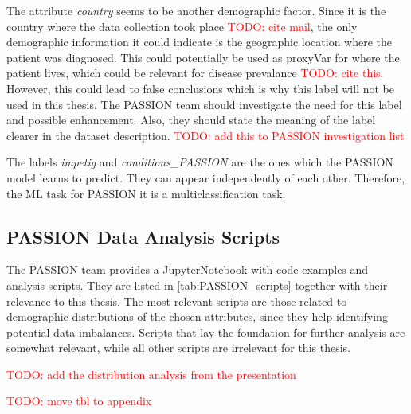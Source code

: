 \documentclass[12pt, a4paper, oneside]{book}   	%
\renewcommand{\todo}[1]{\textcolor{red}{TODO: #1}}
\begin{document}
				The attribute \textit{country} seems to be another demographic factor. Since it is the country where the data collection took place \todo{cite mail}, the only demographic information it could indicate is the geographic location where the patient was diagnosed. This could potentially be used as \gls{proxyVar} for where the patient lives, which could be relevant for disease prevalance \todo{cite this}. However, this could lead to false conclusions which is why this label will not be used in this thesis. The PASSION team should investigate the need for this label and possible enhancement. Also, they should state the meaning of the label clearer in the dataset description. \todo{add this to PASSION investigation list}
				
				The labels \textit{impetig} and \textit{conditions\_PASSION} are the ones which the PASSION model learns to predict. They can appear independently of each other. Therefore, the \gls{ML} task for PASSION it is a multiclassification task.
			
			\subsection{PASSION Data Analysis Scripts}
				The PASSION team provides a \gls{JupyterNotebook} with code examples and analysis scripts. They are listed in \autoref{tab:PASSION_scripts} together with their relevance to this thesis. The most relevant scripts are those related to demographic distributions of the chosen attributes, since they help identifying potential data imbalances. Scripts that lay the foundation for further analysis are somewhat relevant, while all other scripts are irrelevant for this thesis.
				
				\todo{add the distribution analysis from the presentation}
				
				\todo{move tbl to appendix}
				
\end{document}
